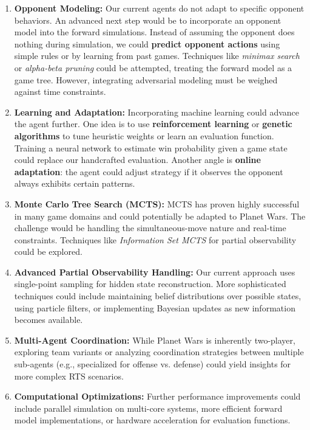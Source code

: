 \documentclass[conference]{IEEEtran}
\begin{document}
\begin{enumerate}
\item \textbf{Opponent Modeling:} Our current agents do not adapt to specific opponent behaviors. An advanced next step would be to incorporate an opponent model into the forward simulations. Instead of assuming the opponent does nothing during simulation, we could \textbf{predict opponent actions} using simple rules or by learning from past games. Techniques like \textit{minimax search} or \textit{alpha-beta pruning} could be attempted, treating the forward model as a game tree. However, integrating adversarial modeling must be weighed against time constraints.

\item \textbf{Learning and Adaptation:} Incorporating machine learning could advance the agent further. One idea is to use \textbf{reinforcement learning} or \textbf{genetic algorithms} to tune heuristic weights or learn an evaluation function. Training a neural network to estimate win probability given a game state could replace our handcrafted evaluation. Another angle is \textbf{online adaptation}: the agent could adjust strategy if it observes the opponent always exhibits certain patterns.

\item \textbf{Monte Carlo Tree Search (MCTS):} MCTS has proven highly successful in many game domains and could potentially be adapted to Planet Wars. The challenge would be handling the simultaneous-move nature and real-time constraints. Techniques like \textit{Information Set MCTS} for partial observability could be explored.

\item \textbf{Advanced Partial Observability Handling:} Our current approach uses single-point sampling for hidden state reconstruction. More sophisticated techniques could include maintaining belief distributions over possible states, using particle filters, or implementing Bayesian updates as new information becomes available.

\item \textbf{Multi-Agent Coordination:} While Planet Wars is inherently two-player, exploring team variants or analyzing coordination strategies between multiple sub-agents (e.g., specialized for offense vs. defense) could yield insights for more complex RTS scenarios.

\item \textbf{Computational Optimizations:} Further performance improvements could include parallel simulation on multi-core systems, more efficient forward model implementations, or hardware acceleration for evaluation functions.
\end{enumerate}
\end{document}
